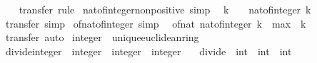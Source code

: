 \begin{isabellebody}
%
\isadelimproof
\ \ %
\endisadelimproof
%
\isatagproof
{}\isamarkupfalse%
\ transfer\ rule%
\endisatagproof
{\isafoldproof}%
%
\isadelimproof
\isanewline
%
\endisadelimproof
\isanewline
{}\isamarkupfalse%
\ nat{\isacharunderscore}{\kern0pt}of{\isacharunderscore}{\kern0pt}integer{\isacharunderscore}{\kern0pt}non{\isacharunderscore}{\kern0pt}positive\ {\isacharbrackleft}{\kern0pt}simp{\isacharbrackright}{\kern0pt}{\isacharcolon}{\kern0pt}\isanewline
\ \ {\isachardoublequoteopen}k\ {\isasymle}\ {}\ {\isasymLongrightarrow}\ nat{\isacharunderscore}{\kern0pt}of{\isacharunderscore}{\kern0pt}integer\ k\ {\isacharequal}{\kern0pt}\ {}{\isachardoublequoteclose}\isanewline
%
\isadelimproof
\ \ %
\endisadelimproof
%
\isatagproof
{}\isamarkupfalse%
\ transfer\ simp%
\endisatagproof
{\isafoldproof}%
%
\isadelimproof
\isanewline
%
\endisadelimproof
\isanewline
{}\isamarkupfalse%
\ of{\isacharunderscore}{\kern0pt}nat{\isacharunderscore}{\kern0pt}of{\isacharunderscore}{\kern0pt}integer\ {\isacharbrackleft}{\kern0pt}simp{\isacharbrackright}{\kern0pt}{\isacharcolon}{\kern0pt}\isanewline
\ \ {\isachardoublequoteopen}of{\isacharunderscore}{\kern0pt}nat\ {\isacharparenleft}{\kern0pt}nat{\isacharunderscore}{\kern0pt}of{\isacharunderscore}{\kern0pt}integer\ k{\isacharparenright}{\kern0pt}\ {\isacharequal}{\kern0pt}\ max\ {}\ k{\isachardoublequoteclose}\isanewline
%
\isadelimproof
\ \ %
\endisadelimproof
%
\isatagproof
{}\isamarkupfalse%
\ transfer\ auto%
\endisatagproof
{\isafoldproof}%
%
\isadelimproof
\isanewline
%
\endisadelimproof
\isanewline
{}\isamarkupfalse%
\ integer\ {\isacharcolon}{\kern0pt}{\isacharcolon}{\kern0pt}\ unique{\isacharunderscore}{\kern0pt}euclidean{\isacharunderscore}{\kern0pt}ring\isanewline
{}\isanewline
\isanewline
{}\isamarkupfalse%
\ divide{\isacharunderscore}{\kern0pt}integer\ {\isacharcolon}{\kern0pt}{\isacharcolon}{\kern0pt}\ {\isachardoublequoteopen}integer\ {\isasymRightarrow}\ integer\ {\isasymRightarrow}\ integer{\isachardoublequoteclose}\isanewline
\ \ \ {\isachardoublequoteopen}divide\ {\isacharcolon}{\kern0pt}{\isacharcolon}{\kern0pt}\ int\ {\isasymRightarrow}\ int\ {\isasymRightarrow}\ int{\isachardoublequoteclose}\isanewline
%
\isadelimproof
\ \ %
\endisadelimproof
%
\isatagproof
\isacommand{{\isachardot}{\kern0pt}}\isamarkupfalse%
%
\endisatagproof
{\isafoldproof}%
%
\isadelimproof
\isanewline
%
\endisadelimproof
\isanewline

\end{isabellebody}

